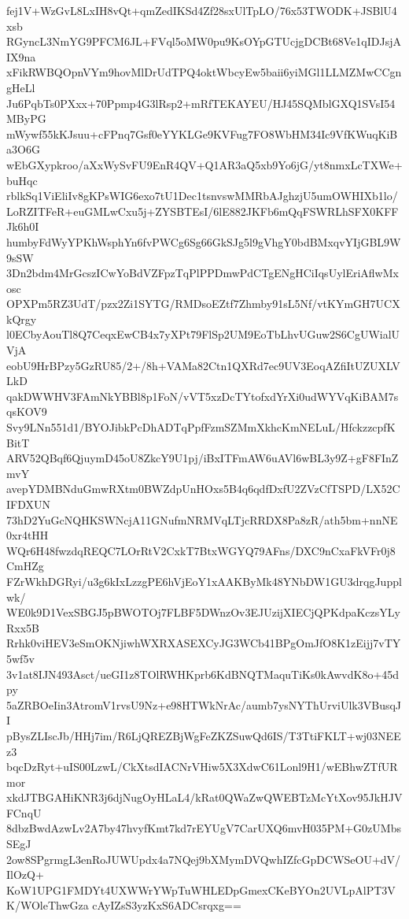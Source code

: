 fej1V+WzGvL8LxIH8vQt+qmZedIKSd4Zf28sxUlTpLO/76x53TWODK+JSBlU4xsb
RGyncL3NmYG9PFCM6JL+FVql5oMW0pu9KsOYpGTUcjgDCBt68Ve1qIDJsjAIX9na
xFikRWBQOpnVYm9hovMlDrUdTPQ4oktWbcyEw5baii6yiMGl1LLMZMwCCgngHeLl
Ju6PqbTs0PXxx+70Ppmp4G3lRsp2+mRfTEKAYEU/HJ45SQMblGXQ1SVsI54MByPG
mWywf55kKJsuu+cFPnq7Gsf0eYYKLGe9KVFug7FO8WbHM34Ic9VfKWuqKiBa3O6G
wEbGXypkroo/aXxWySvFU9EnR4QV+Q1AR3aQ5xb9Yo6jG/yt8nmxLcTXWe+buHqc
rblkSq1ViEliIv8gKPsWIG6exo7tU1Dec1tsnvswMMRbAJghzjU5umOWHIXb1lo/
LoRZITFeR+euGMLwCxu5j+ZYSBTEsI/6lE882JKFb6mQqFSWRLhSFX0KFFJk6h0I
humbyFdWyYPKhWsphYn6fvPWCg6Sg66GkSJg5l9gVhgY0bdBMxqvYIjGBL9W9sSW
3Dn2bdm4MrGcszICwYoBdVZFpzTqPlPPDmwPdCTgENgHCiIqsUylEriAflwMxosc
OPXPm5RZ3UdT/pzx2Zi1SYTG/RMDsoEZtf7Zhmby91sL5Nf/vtKYmGH7UCXkQrgy
l0ECbyAouTl8Q7CeqxEwCB4x7yXPt79FlSp2UM9EoTbLhvUGuw2S6CgUWialUVjA
eobU9HrBPzy5GzRU85/2+/8h+VAMa82Ctn1QXRd7ec9UV3EoqAZfiItUZUXLVLkD
qakDWWHV3FAmNkYBBl8p1FoN/vVT5xzDcTYtofxdYrXi0udWYVqKiBAM7sqsKOV9
Svy9LNn551d1/BYOJibkPcDhADTqPpfFzmSZMmXkhcKmNELuL/HfckzzcpfKBitT
ARV52QBqf6QjuymD45oU8ZkcY9U1pj/iBxITFmAW6uAVl6wBL3y9Z+gF8FInZmvY
avepYDMBNduGmwRXtm0BWZdpUnHOxs5B4q6qdfDxfU2ZVzCfTSPD/LX52CIFDXUN
73hD2YuGcNQHKSWNcjA11GNufmNRMVqLTjcRRDX8Pa8zR/ath5bm+nnNE0xr4tHH
WQr6H48fwzdqREQC7LOrRtV2CxkT7BtxWGYQ79AFns/DXC9nCxaFkVFr0j8CmHZg
FZrWkhDGRyi/u3g6kIxLzzgPE6hVjEoY1xAAKByMk48YNbDW1GU3drqgJupplwk/
WE0k9D1VexSBGJ5pBWOTOj7FLBF5DWnzOv3EJUzijXIECjQPKdpaKczsYLyRxx5B
Rrhk0viHEV3eSmOKNjiwhWXRXASEXCyJG3WCb41BPgOmJfO8K1zEijj7vTY5wf5v
3v1at8IJN493Asct/ueGI1z8TOlRWHKprb6KdBNQTMaquTiKs0kAwvdK8o+45dpy
5aZRBOeIin3AtromV1rvsU9Nz+e98HTWkNrAc/aumb7ysNYThUrviUlk3VBusqJI
pBysZLIscJb/HHj7im/R6LjQREZBjWgFeZKZSuwQd6IS/T3TtiFKLT+wj03NEEz3
bqcDzRyt+uIS00LzwL/CkXtsdIACNrVHiw5X3XdwC61Lonl9H1/wEBhwZTfURmor
xkdJTBGAHiKNR3j6djNugOyHLaL4/kRat0QWaZwQWEBTzMcYtXov95JkHJVFCnqU
8dbzBwdAzwLv2A7by47hvyfKmt7kd7rEYUgV7CarUXQ6mvH035PM+G0zUMbsSEgJ
2ow8SPgrmgL3enRoJUWUpdx4a7NQej9bXMymDVQwhIZfcGpDCWSeOU+dV/IlOzQ+
KoW1UPG1FMDYt4UXWWrYWpTuWHLEDpGmexCKeBYOn2UVLpAlPT3VK/WOleThwGza
cAyIZsS3yzKxS6ADCsrqxg==
